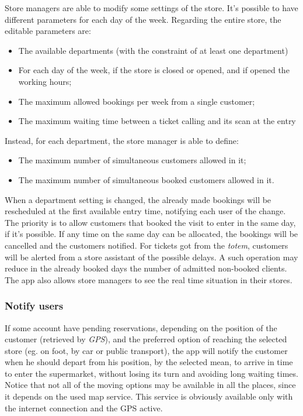 \documentclass{article}
\begin{document}
		Store managers are able to modify some settings of the store. It's possible to have different parameters for each day of the week. Regarding the entire store, the editable parameters are:
		\begin{itemize}
			\item The available departments (with the constraint of at least one department)
			\item For each day of the week, if the store is closed or opened, and if opened the working hours;
			\item The maximum allowed bookings per week from a single customer;
			\item The maximum waiting time between a ticket calling and its scan at the entry
		\end{itemize}
	
		Instead, for each department, the store manager is able to define:
		\begin{itemize}
			\item The maximum number of simultaneous customers allowed in it;
			\item The maximum number of simultaneous booked customers allowed in it.
		\end{itemize}
	 When a department setting is changed, the already made bookings will be rescheduled at the first available entry time, notifying each user of the change. The priority is to allow customers that booked the visit to enter in the same day, if it's possible. If any time on the same day can be allocated, the bookings will be cancelled and the customers notified. For tickets got from the \emph{totem}, customers will be alerted from a store assistant of the possible delays. A such operation may reduce in the already booked days the number of admitted non-booked clients. 
	 The app also allows store managers to see the real time situation in their stores.
	
		\subsubsection{Notify users}
		
		If some account have pending reservations, depending on the position of the customer (retrieved by \emph{GPS}), and the preferred option of reaching the selected store (eg. on foot, by car or public transport), the app will notify the customer when he should depart from his position, by the selected mean, to arrive in time to enter the supermarket, without losing its turn and avoiding long waiting times. Notice that not all of the moving options may be available in all the places, since it depends on the used map service. This service is obviously available only with the internet connection and the GPS active.
		
\end{document}
